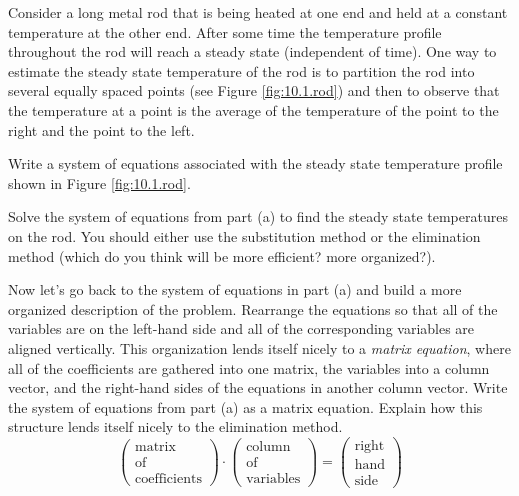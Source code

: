 % 
\begin{problem}
    Consider a long metal rod that is being heated at one end and held at a constant
    temperature at the other end.  After some time the temperature profile throughout the
    rod will reach a steady state (independent of time).  One way to estimate the steady
    state temperature of the rod is to partition the rod into several equally spaced
    points (see Figure \ref{fig:10.1.rod}) and then to observe that the temperature at a point is the
    average of the temperature of the point to the right and the point to the left.  

    \ba
        \item Write a system of equations associated with the steady state temperature
            profile shown in Figure \ref{fig:10.1.rod}.
        \item Solve the system of equations from part (a) to find the steady state
            temperatures on the rod. You should either use the substitution method or the
            elimination method (which do you think will be more efficient?  more
            organized?).
        \item Now let's go back to the system of equations in part (a) and build a more
            organized description of the problem.  Rearrange the equations so that all of
            the variables are on the left-hand side and all of the corresponding variables
            are aligned vertically. This organization lends itself nicely to a {\it matrix
            equation}, where all of the coefficients are gathered into one matrix, the
            variables into a column vector, and the right-hand sides of the equations in
            another column vector.  Write the system of equations from part (a) as a
            matrix equation.  Explain how this structure lends itself nicely to the
            elimination method.
            \[ \begin{pmatrix} \text{matrix} \\ \text{of} \\ \text{coefficients}
                \end{pmatrix} \cdot \begin{pmatrix} \text{column} \\ \text{of} \\
                    \text{variables} \end{pmatrix} = \begin{pmatrix} \text{right} \\
                        \text{hand}\\ \text{side}  \end{pmatrix} \]
    \ea


\end{problem}
